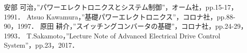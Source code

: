 \documentclass[a4paper,12pt]{jarticle}
\begin{document}


\begin{thebibliography}{99}
 安部 可治，”パワーエレクトロニクスとシステム制御”，オーム社，pp.15-17，1991．
 Atsuo Kawamura，”基礎パワーエレクトロニクス”，コロナ社，pp.88-90，1997．
 原田 耕介，”スイッチングコンバータの基礎”，コロナ社，pp.24-29，1993．
 T.Sakamoto，”Lecture Note of Advanced Electrical Drive Control System”，pp.23，2017．
\end{thebibliography}
\end{document}
